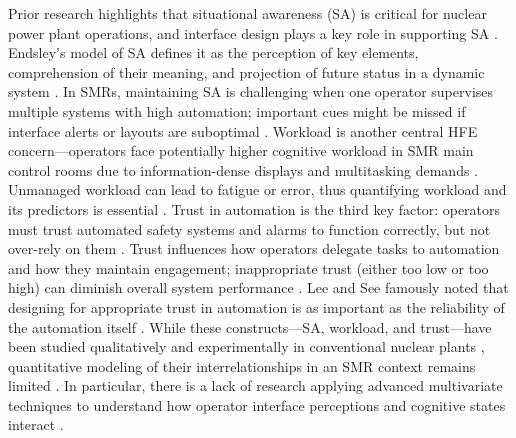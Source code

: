 \documentclass[conference]{IEEEtran}
\begin{document}
Prior research highlights that situational awareness (SA) is critical for nuclear power plant operations, and interface design plays a key role in supporting SA \cite{sciencedirect2025structural, iop2022analysis, cms2024human, taylor1995situation}. Endsley’s model of SA defines it as the perception of key elements, comprehension of their meaning, and projection of future status in a dynamic system \cite{sage1995toward, taylor1995situation, sciencedirect2025structural, iop2022analysis}. In SMRs, maintaining SA is challenging when one operator supervises multiple systems with high automation; important cues might be missed if interface alerts or layouts are suboptimal \cite{cms2024human, sciencedirect2015measuring, nrc2016human, oecd2016technical}. Workload is another central HFE concern—operators face potentially higher cognitive workload in SMR main control rooms due to information-dense displays and multitasking demands \cite{nuclear2024analysis, pubmed2024effects, sciencedirect2015situation, oecd2016technical}. Unmanaged workload can lead to fatigue or error, thus quantifying workload and its predictors is essential \cite{sciencedirect2015situation, nuclear2024analysis, pubmed2024effects, taylor1995situation}. Trust in automation is the third key factor: operators must trust automated safety systems and alarms to function correctly, but not over-rely on them \cite{sage2004trust, taylor2025small, sage1997trust, researchgate2012human}. Trust influences how operators delegate tasks to automation and how they maintain engagement; inappropriate trust (either too low or too high) can diminish overall system performance \cite{sage1997trust, progress2023automation, sage2004trust, sage2010trust}. Lee and See famously noted that designing for appropriate trust in automation is as important as the reliability of the automation itself \cite{sage2004trust, researchgate2012human, taylor2025small, sage1997trust}. While these constructs—SA, workload, and trust—have been studied qualitatively and experimentally in conventional nuclear plants \cite{oecd2016technical, nrc2016human, iapsam2022human}, quantitative modeling of their interrelationships in an SMR context remains limited \cite{nuclear2024analysis, taylor1995situation, reliability2019structural, taylor2023structural}. In particular, there is a lack of research applying advanced multivariate techniques to understand how operator interface perceptions and cognitive states interact \cite{reliability2019structural, taylor2023structural, taylor1999cutoff, guilford2016principles}.
\end{document}
